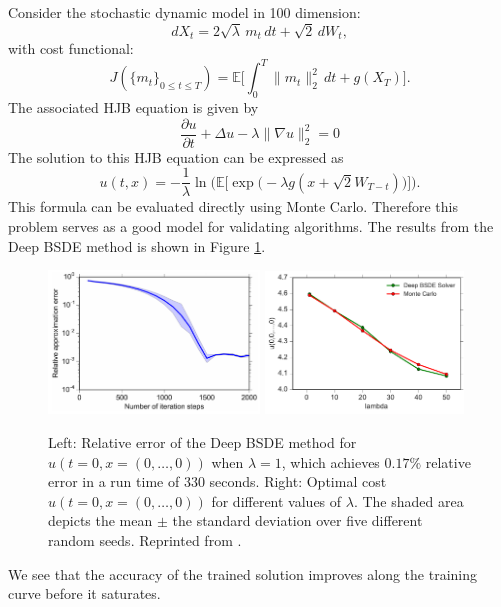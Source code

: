 \documentclass[12pt]{article}
\theoremstyle{definition}
\newcommand{\E}{\mathbb{E}}
\begin{document}
Consider the stochastic dynamic model in 100 dimension:
\begin{equation}
            dX_t = 2\sqrt{\lambda}\,m_t\,dt+\sqrt{2}\,dW_t,
 \end{equation}
 with cost functional:
\begin{equation}
J( \{ m_t \}_{ 0 \leq t \leq T } ) =
          \E\big[
            \int_0^T \|m_t\|_2^2 \, dt + g(X_T)
          \big].
\end{equation}
        The associated HJB equation is given by
        \begin{equation}
     \frac{ \partial u}{ \partial t } + \Delta u  - \lambda \|\nabla u \|_2^2 = 0
        \end{equation}
        The solution to this HJB equation can be expressed as
\begin{equation}
                  u(t,x) = - \frac{ 1}{ \lambda }
                  \ln\!\bigg(
                    \E\Big[
                      \exp\!\Big(
                         - \lambda g( x + \sqrt{ 2 }W_{ T - t }  )
                      \Big)
                    \Big]
                  \bigg).
                \end{equation}
                This formula can be evaluated directly using Monte Carlo. Therefore this problem serves as a good model
                for validating algorithms. The results from the Deep BSDE method is shown in Figure \ref{fig:LQR}.
\begin{figure}[H]
    \centering
    \includegraphics[width=0.5\textwidth]{./figs/SquareGradient_d100_Relative_approximation_error}
    \includegraphics[width=0.47\textwidth]{./figs/HJB_parameter}
    \caption{Left: Relative error of the Deep BSDE method for $ u( t{=}0, x{=}(0,\dots,0) )$ when $ \lambda = 1 $,
    which achieves $ 0.17\% $ relative error in a run time of 330 seconds. 
    Right: Optimal cost $u(t{=}0,x{=}(0,\dots,0))$ for different values of $\lambda$.
    The shaded area depicts the mean $\pm$ the standard deviation over five different random seeds. 
    Reprinted from \cite{HanJentzenE2018}.
    }
    \label{fig:LQR}
\end{figure}
We see that the accuracy of the trained solution improves along the training curve before it saturates.
\end{document}
